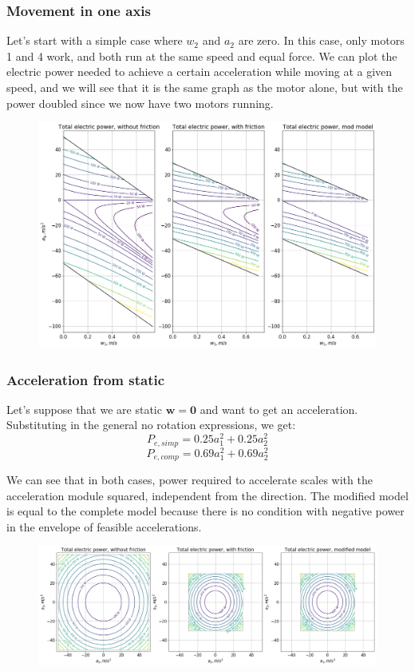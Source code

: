 \documentclass[12pt]{article}
\renewcommand{\vec}[1]{\bm{#1}}
\begin{document}
\subsubsection{Movement in one axis}
Let's start with a simple case where $w_2$ and $a_2$ are zero. In this case, only motors 1 and 4 work, and both run at the same speed and equal force. We can plot the electric power needed to achieve a certain acceleration while moving at a given speed, and we will see that it is the same graph as the motor alone, but with the power doubled since we now have two motors running.

\begin{figure}[h]
	\centering
	\includegraphics[width=1\linewidth]{total_electric_power_w_and_wout_fricc}
	\label{fig:power_f_a1_w1}
\end{figure}

\subsubsection{Acceleration from static}
Let's suppose that we are static $\vec{w} = \vec{0}$ and want to get an acceleration. Substituting in the general no rotation expressions, we get:
$$P_{e, simp} = 0.25 a_{1}^{2} + 0.25 a_{2}^{2}$$
$$P_{e, comp} = 0.69 a_{1}^{2} + 0.69 a_{2}^{2}$$

We can see that in both cases, power required to accelerate scales with the acceleration module squared, independent from the direction. The modified model is equal to the complete model because there is no condition with negative power in the envelope of feasible accelerations.
\begin{figure}[h]
	\centering
	\includegraphics[width=1\linewidth]{power_from_static}
	\label{fig:power_from_static}
\end{figure}
\end{document}
